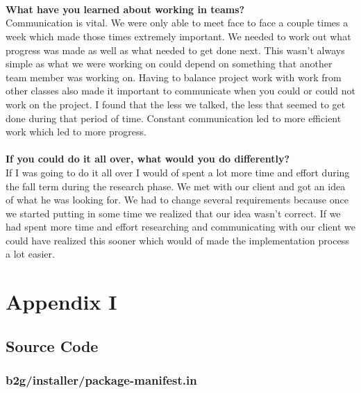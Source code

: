 \documentclass[12pt]{article}
\begin{document}
\\\\\\
\textbf{What have you learned about working in teams?}\\
Communication is vital. We were only able to meet face to face a couple times a week which made those times extremely important. We needed to work out what progress was made as well as what needed to get done next.  This wasn't always simple as what we were working on could depend on something that another team member was working on.  Having to balance project work with work from other classes also made it important to communicate when you could or could not work on the project.  I found that the less we talked, the less that seemed to get done during that period of time.  Constant communication led to more efficient work which led to more progress.   
\\\\
\textbf{If you could do it all over, what would you do differently?}\\
If I was going to do it all over I would of spent a lot more time and effort during the fall term during the research phase.  We met with our client and got an idea of what he was looking for. We had to change several requirements because once we started putting in some time we realized that our idea wasn't correct.  If we had spent more time and effort researching and communicating with our client we could have realized this sooner which would of made the implementation process a lot easier.  
\pagebreak

\appendix
\section{Appendix I}
\subsection{Source Code}

\subsubsection{b2g/installer/package-manifest.in}

\pagebreak
\end{document}
